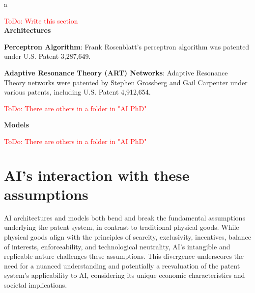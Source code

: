 a\documentclass{article}[10pt]
\begin{document}
\textcolor{red}{ToDo: Write this section}\\
\textbf{Architectures}

\textbf{Perceptron Algorithm}: Frank Rosenblatt's perceptron algorithm was patented under U.S. Patent 3,287,649.

\textbf{Adaptive Resonance Theory (ART) Networks}: Adaptive Resonance Theory networks were patented by Stephen Grossberg and Gail Carpenter under various patents, including U.S. Patent 4,912,654.

\textcolor{red}{ToDo: There are others in a folder in "AI PhD"}

\textbf{Models}

\textcolor{red}{ToDo: There are others in a folder in "AI PhD"}

\section{AI's interaction with these assumptions}

AI architectures and models both bend and break the fundamental assumptions underlying the patent system, in contrast to traditional physical goods. While physical goods align with the principles of scarcity, exclusivity, incentives, balance of interests, enforceability, and technological neutrality, AI's intangible and replicable nature challenges these assumptions. This divergence underscores the need for a nuanced understanding and potentially a reevaluation of the patent system's applicability to AI, considering its unique economic characteristics and societal implications.
\end{document}

